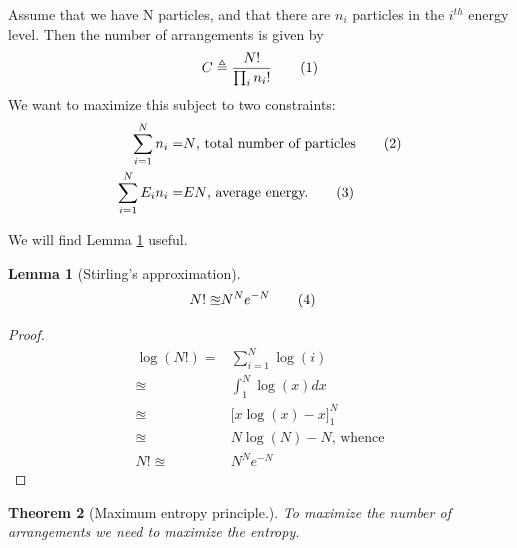 \documentclass[]{article}
\newcommand\numberthis{\addtocounter{equation}{1}\tag{\theequation}}
\newtheorem{thm}{Theorem}
\newtheorem{lemma}[thm]{Lemma}
\begin{document}
Assume that we have N particles, and that there are $n_i$ particles in the $i^{th}$ energy level. Then the number of arrangements is given by
\begin{align*}
C\triangleq\frac{N!}{\prod_{i}n_i!} \numberthis \label{eq:number:combinations}
\end{align*}
 We want to maximize this subject to two constraints:
\begin{align*}
\sum_{i=1}^{N} n_i =& N \text{, total number of particles} \numberthis\label{eq:sum:probilities}\\
\sum_{i=1}^{N} E_i n_i =& E N \text{, average energy.}\numberthis\label{eq:total:energy}
\end{align*}

We will find Lemma \ref{lemma:Stirling} useful.
\begin{lemma}[Stirling's approximation]\label{lemma:Stirling}
	\begin{align*}
	N! \approxeq& N^N e^{-N}\numberthis\label{eq:stirling}
	\end{align*}
\end{lemma}

\begin{proof}
	\begin{align*}
	\log(N!) =& \sum_{i=1}^{N}\log (i)\\
	\approxeq &\int_{1}^{N} \log(x) dx\\
	\approxeq& \big[x \log(x) - x \big]_1^N\\
	\approxeq& N\log(N)-N\text{, whence} \\
	N! \approxeq& N^N e^{-N}
	\end{align*}
\end{proof}	

\begin{thm}[Maximum entropy principle.]
	To maximize the number of arrangements we need to maximize the entropy.
\end{thm}
\end{document}
